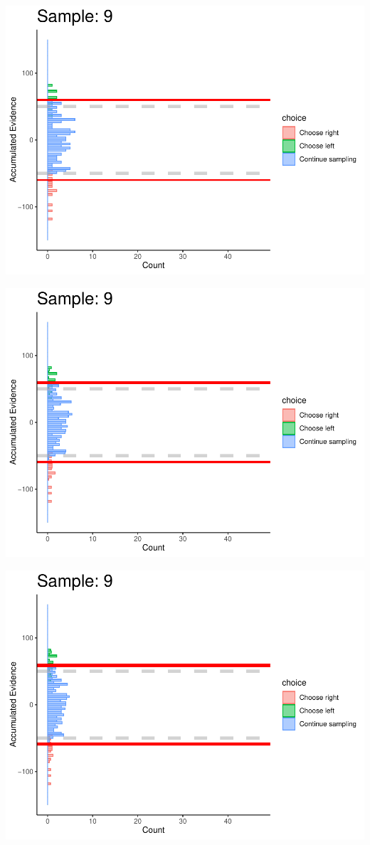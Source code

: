 \documentclass[
]{book}
\begin{document}
\begin{center}\includegraphics[width=0.8\linewidth]{LateNightBayes_files/figure-latex/fixed_dcb-85} \end{center}

\begin{center}\includegraphics[width=0.8\linewidth]{LateNightBayes_files/figure-latex/fixed_dcb-86} \end{center}

\begin{center}\includegraphics[width=0.8\linewidth]{LateNightBayes_files/figure-latex/fixed_dcb-87} \end{center}
\end{document}
